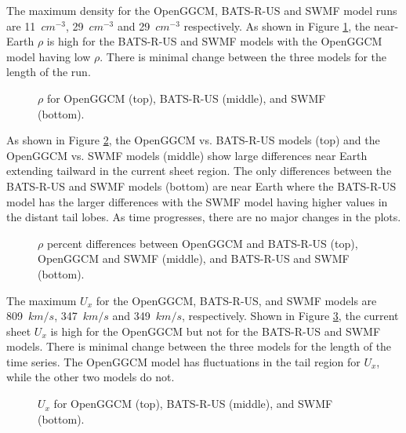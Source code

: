 The maximum density for the OpenGGCM, BATS-R-US and SWMF model runs are
11~$cm^{-3}$, 29~$cm^{-3}$ and 29~$cm^{-3}$ respectively. As shown in Figure
\ref{fig:rhoLowCompressionBeginning}, the near-Earth $\rho$ is high for the
BATS-R-US and SWMF models with the OpenGGCM model having low $\rho$. There is
minimal change between the three models for the length of the run.
\begin{figure}
	\centering
	\caption{$\rho$ for OpenGGCM (top), BATS-R-US (middle), and SWMF (bottom).}
	\figSpace
	\label{fig:rhoLowCompressionBeginning}
\end{figure}

As shown in Figure \ref{fig:rhoDiffLowBeginning}, the OpenGGCM vs. BATS-R-US
models (top) and the OpenGGCM vs. SWMF models (middle) show large differences
near Earth extending tailward in the current sheet region. The only differences between the BATS-R-US
and SWMF models (bottom) are near Earth where the BATS-R-US model has the larger
differences with the SWMF model having higher values in the distant tail lobes.
As time progresses, there are no major changes in the plots.
\begin{figure}
	\centering
    \caption{$\rho$ percent differences between OpenGGCM and BATS-R-US (top),
    OpenGGCM and SWMF (middle), and BATS-R-US and SWMF (bottom).
    }
    \label{fig:rhoDiffLowBeginning}
	\figSpace
\end{figure}

The maximum $U_x$ for the OpenGGCM, BATS-R-US, and SWMF models are 809~$km/s$,
347~$km/s$ and 349~$km/s$, respectively. Shown in Figure
\ref{fig:UxLowCompressionBeginning}, the current sheet $U_x$ is high for the
OpenGGCM but not for the BATS-R-US and SWMF models. There is minimal change
between the three models for the length of the time series. The OpenGGCM model
has fluctuations in the tail region for $U_x$, while the other two models do not.
\begin{figure}
	\centering
	\caption{$U_x$ for OpenGGCM (top), BATS-R-US (middle), and SWMF (bottom).}
	\figSpace
	\label{fig:UxLowCompressionBeginning}
\end{figure}

